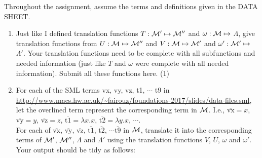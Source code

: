 \documentclass[11pt]{article}
\begin{document}
\maketitle


Throughout the assignment, assume the terms and definitions given in the DATA SHEET.



\begin{enumerate}
  

      \item
        Just like I defined translation functions  $T:{\cal M}'\mapsto {\cal M}''$ and  $\omega: {\cal M}\mapsto$ $\Lambda$, give translation functions from
        $U:{\cal M}\mapsto {\cal M}''$ and  $V:{\cal M}\mapsto{\cal M}'$ and  $\omega':{\cal M}'\mapsto$ $\Lambda'$.   Your translation functions need to be complete with all subfunctions and needed information (just like $T$ and $\omega$ were complete with all needed information).   Submit all these functions here.
        \hfill{(1)} %
    \item
      For each of the SML terms vx, vy, vz, t1, $\cdots$ t9 in \url{http://www.macs.hw.ac.uk/~fairouz/foundations-2017/slides/data-files.sml}, let the overlined term represent the corresponding term in ${\cal M}$.  I.e., $\overline{\mbox{vx}} = x$, $\overline{\mbox{vy}} = y$, $\overline{\mbox{vz}} = z$, $\overline{\mbox{t1}} = \lambda x.x$, $\overline{\mbox{t2}}
      = \lambda y.x$, $\cdots$.\\
      For each of $\overline{\mbox{vx}}$, $\overline{\mbox{vy}}$, $\overline{\mbox{vz}}$, $\overline{\mbox{t1}}$,
      $\overline{\mbox{t2}}$, $\cdots \overline{\mbox{t9}}$ in ${\cal M}$, translate it into the corresponding terms of ${\cal M}'$, ${\cal M}''$, $\Lambda$ and  $\Lambda'$ using the translation functions $V$, $U$, $\omega$ and $\omega'$.  \\
      Your output should be tidy as follows:


\end{enumerate}
\end{document}

